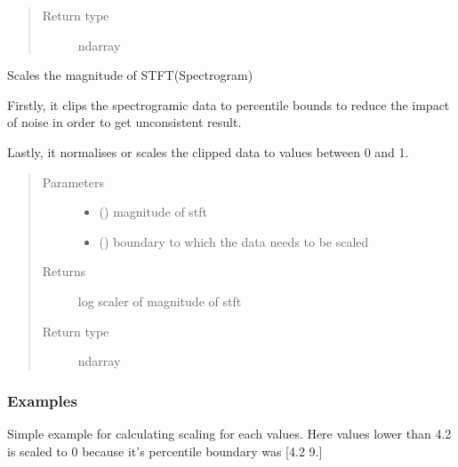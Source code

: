 \documentclass[letterpaper,10pt,english,openany,oneside]{sphinxmanual}
\begin{document}
\begin{fulllineitems}
\begin{fulllineitems}
\begin{quote}
\begin{description}
\item[{Return type}] \leavevmode
ndarray

\end{description}\end{quote}

\end{fulllineitems}


\begin{fulllineitems}
\label{\detokenize{docs/source/preprocess:preprocess.preprocess_tools.Scaler.scale}}
Scales the magnitude of STFT(Spectrogram)

Firstly, it clips the spectrogramic data to percentile bounds
to reduce the impact of noise in order to get unconsistent result.

Lastly, it normalises or scales the clipped data to values between 0 and 1.
\begin{quote}\begin{description}
\item[{Parameters}] \leavevmode\begin{itemize}
\item {} 
 () \textendash{} magnitude of stft

\item {} 
 () \textendash{} boundary to which the data needs to be scaled

\end{itemize}

\item[{Returns}] \leavevmode
{} \textendash{} log scaler of magnitude of stft

\item[{Return type}] \leavevmode
ndarray

\end{description}\end{quote}
\subsubsection*{Examples}

Simple example for calculating scaling for each values.
Here values lower than 4.2 is scaled to 0 because it’s percentile
boundary was {[}4.2 9.{]}


\end{fulllineitems}
\end{fulllineitems}
\end{document}

